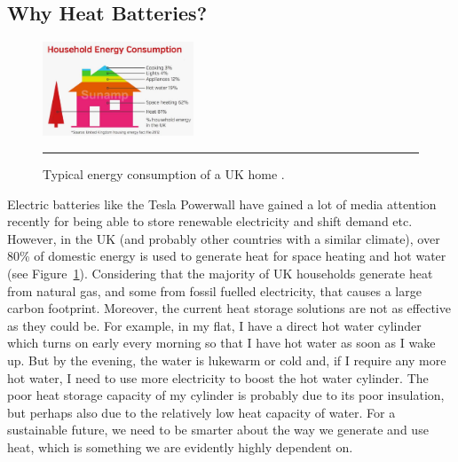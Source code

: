 \newpage
\subsection*{Why Heat Batteries?}

\begin{figure}
	\includegraphics[width=0.4\textwidth]{figures/household-energy-consumption.jpg}
	\rule{0.4\textwidth}{0.5pt} %
	\caption{Typical energy consumption of a UK home \citep{SunampResidential}.}
	\label{fig:domestic-energy}
\end{figure}

Electric batteries like the Tesla Powerwall have gained a lot of media attention recently for being able to store renewable electricity and shift demand etc.
However, in the UK (and probably other countries with a similar climate), over 80\% of domestic energy is used to generate heat for space heating and hot water (see Figure~\ref{fig:domestic-energy}).
Considering that the majority of UK households generate heat from natural gas, and some from fossil fuelled electricity, that causes a large carbon footprint.
Moreover, the current heat storage solutions are not as effective as they could be.
For example, in my flat, I have a direct hot water cylinder which turns on early every morning so that I have hot water as soon as I wake up.
But by the evening, the water is lukewarm or cold and, if I require any more hot water, I need to use more electricity to boost the hot water cylinder.
The poor heat storage capacity of my cylinder is probably due to its poor insulation, but perhaps also due to the relatively low heat capacity of water.
For a sustainable future, we need to be smarter about the way we generate and use heat, which is something we are evidently highly dependent on.




